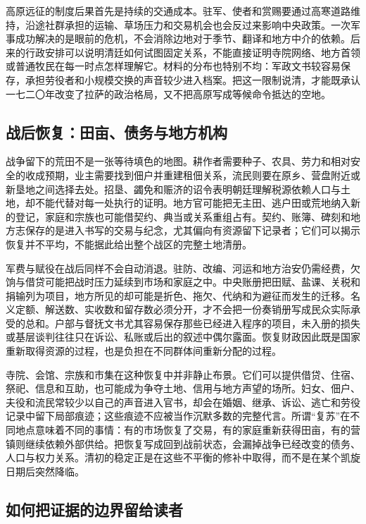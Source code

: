 高原远征的制度后果首先是持续的交通成本。驻军、使者和赏赐要通过高寒道路维持，沿途社群承担的运输、草场压力和交易机会也会反过来影响中央政策。一次军事成功解决的是眼前的危机，不会消除边地对于季节、翻译和地方中介的依赖。后来的行政安排可以说明清廷如何试图固定关系，不能直接证明寺院网络、地方首领或普通牧民在每一时点怎样理解它。材料的分布也特别不均：军政文书较容易保存，承担劳役者和小规模交换的声音较少进入档案。把这一限制说清，才能既承认一七二〇年改变了拉萨的政治格局，又不把高原写成等候命令抵达的空地。

\subsection*{战后恢复：田亩、债务与地方机构}

战争留下的荒田不是一张等待填色的地图。耕作者需要种子、农具、劳力和相对安全的收成预期，业主需要找到佃户并重建租佃关系，流民则要在原乡、营盘附近或新垦地之间选择去处。招垦、蠲免和赈济的诏令表明朝廷理解税源依赖人口与土地，却不能代替对每一处执行的证明。地方官可能把无主田、逃户田或荒地纳入新的登记，家庭和宗族也可能借契约、典当或关系重组占有。契约、账簿、碑刻和地方志保存的是进入书写的交易与纪念，尤其偏向有资源留下记录者；它们可以揭示恢复并不平均，不能据此给出整个战区的完整土地清册。

军费与赋役在战后同样不会自动消退。驻防、改编、河运和地方治安仍需经费，欠饷与借贷可能把战时压力延续到市场和家庭之中。中央账册把田赋、盐课、关税和捐输列为项目，地方所见的却可能是折色、拖欠、代纳和为避征而发生的迁移。名义定额、解送数、实收数和留存数必须分开，才不会把一份奏销册写成民众实际承受的总和。户部与督抚文书尤其容易保存那些已经进入程序的项目，未入册的损失或基层谈判往往只在诉讼、私账或后出的叙述中偶尔露面。恢复财政因此既是国家重新取得资源的过程，也是负担在不同群体间重新分配的过程。

寺院、会馆、宗族和市集在这种恢复中并非静止布景。它们可以提供借贷、住宿、祭祀、信息和互助，也可能成为争夺土地、信用与地方声望的场所。妇女、佃户、夫役和流民常较少以自己的声音进入官书，却会在婚姻、继承、诉讼、逃亡和劳役记录中留下局部痕迹；这些痕迹不应被当作沉默多数的完整代言。所谓“复苏”在不同地点意味着不同的事情：有的市场恢复了交易，有的家庭重新获得田亩，有的营镇则继续依赖外部供给。把恢复写成回到战前状态，会漏掉战争已经改变的债务、人口与权力关系。清初的稳定正是在这些不平衡的修补中取得，而不是在某个凯旋日期后突然降临。

\subsection*{如何把证据的边界留给读者}

